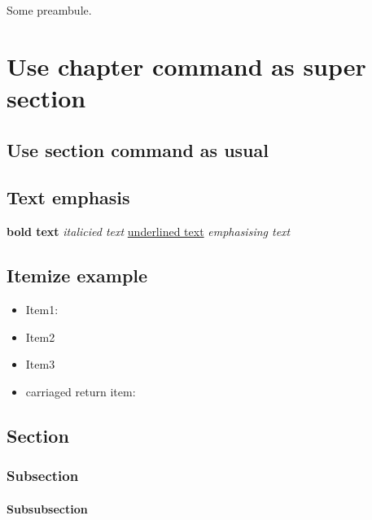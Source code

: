Some preambule.

\chapter{Use chapter command as super section}

\section{Use section command as usual}

\section{Text emphasis}

\textbf{bold text}
\textit{italicied text}
\underline{underlined text}
\emph{emphasising text}

\section{Itemize example}

\begin{itemize}
\item {Item1: \lipsum[1]}
\item {Item2}
\item {Item3}
\end{itemize}
\begin{itemize}
\item {carriaged return item:}
\end{itemize}
\lipsum[1]

\section{Section}

\lipsum[1]
\lipsum[2]

\subsection{Subsection}

\lipsum[1]

\subsubsection{Subsubsection}

